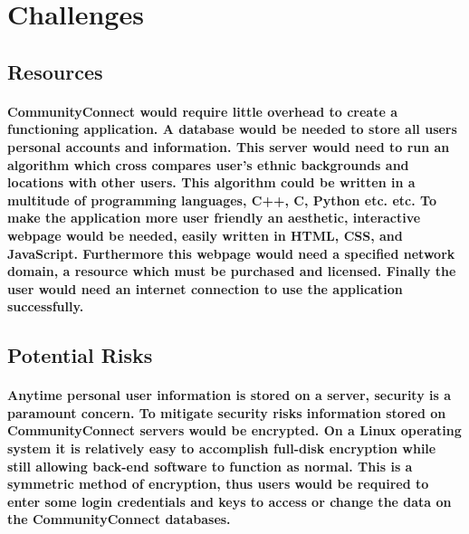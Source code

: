 \documentclass[12pt]{article}
\begin{document}
\section{\bf Challenges}
        \subsection{\bf Resources}
                \paragraph{\normalfont \indent CommunityConnect would require little overhead to create a functioning application. A database would be needed to store all users personal accounts and information. This server would need to run an algorithm which cross compares user’s ethnic backgrounds and locations with other users. This algorithm could be written in a multitude of programming languages, C++, C, Python etc. etc. To make the application more user friendly an aesthetic, interactive webpage would be needed, easily written in HTML, CSS, and JavaScript. Furthermore this webpage would need a specified network domain, a resource which must be purchased and licensed. Finally the user would need an internet connection to use the application successfully.}
        \subsection{\bf Potential Risks}
                \paragraph{\normalfont \indent Anytime personal user information is stored on a server, security is a paramount concern. To mitigate security risks information stored on CommunityConnect servers would be encrypted. On a Linux operating system it is relatively easy to accomplish full-disk encryption while still allowing back-end software to function as normal. This is a symmetric method of encryption, thus users would be required to enter some login credentials and keys to access or change the data on the CommunityConnect databases.}



\end{document}
